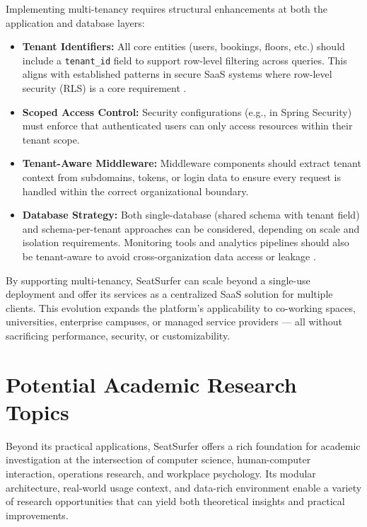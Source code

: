 \documentclass[12pt,a4paper]{report} %
\begin{document}
Implementing multi-tenancy requires structural enhancements at both the application and database layers:

\begin{itemize}
\item \textbf{Tenant Identifiers:}
All core entities (users, bookings, floors, etc.) should include a \texttt{tenant\_id} field to support row-level filtering across queries. This aligns with established patterns in secure SaaS systems where row-level security (RLS) is a core requirement \cite{khattak2021schemas}.
\item \textbf{Scoped Access Control:}  
Security configurations (e.g., in Spring Security) must enforce that authenticated users can only access resources within their tenant scope.
\item \textbf{Tenant-Aware Middleware:}  
Middleware components should extract tenant context from subdomains, tokens, or login data to ensure every request is handled within the correct organizational boundary.
\item \textbf{Database Strategy:}  
Both single-database (shared schema with tenant field) and schema-per-tenant approaches can be considered, depending on scale and isolation requirements. Monitoring tools and analytics pipelines should also be tenant-aware to avoid cross-organization data access or leakage \cite{freeman2022monitoring}.
\end{itemize}

By supporting multi-tenancy, SeatSurfer can scale beyond a single-use deployment and offer its services as a centralized SaaS solution for multiple clients. This evolution expands the platform's applicability to co-working spaces, universities, enterprise campuses, or managed service providers — all without sacrificing performance, security, or customizability.

\section{Potential Academic Research Topics}

Beyond its practical applications, SeatSurfer offers a rich foundation for academic investigation at the intersection of computer science, human-computer interaction, operations research, and workplace psychology. Its modular architecture, real-world usage context, and data-rich environment enable a variety of research opportunities that can yield both theoretical insights and practical improvements.
\end{document}
